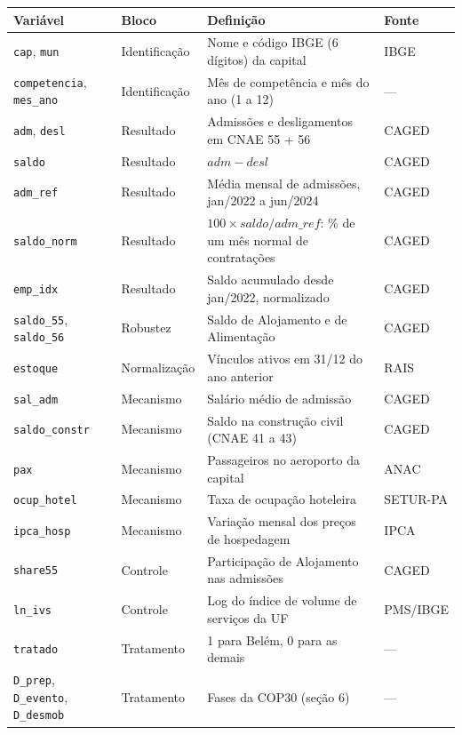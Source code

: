 \documentclass[11pt,a4paper]{article}
\newcommand{\var}[1]{\texttt{#1}}
\begin{document}
\begin{table}[H]
\centering\small
\begin{tabularx}{\linewidth}{p{3.3cm}p{2.1cm}Lp{2cm}}
\toprule
\textbf{Variável} & \textbf{Bloco} & \textbf{Definição} & \textbf{Fonte}\\
\midrule
\var{cap}, \var{mun} & Identificação & Nome e código IBGE (6 dígitos) da capital & IBGE\\
\var{competencia}, \var{mes\_ano} & Identificação & Mês de competência e mês do ano (1 a 12) & ---\\
\var{adm}, \var{desl} & Resultado & Admissões e desligamentos em CNAE 55 + 56 & CAGED\\
\var{saldo} & Resultado & $adm - desl$ & CAGED\\
\var{adm\_ref} & Resultado & Média mensal de admissões, jan/2022 a jun/2024 & CAGED\\
\var{saldo\_norm} & Resultado & $100 \times saldo / adm\_ref$: \% de um mês normal de contratações & CAGED\\
\var{emp\_idx} & Resultado & Saldo acumulado desde jan/2022, normalizado & CAGED\\
\var{saldo\_55}, \var{saldo\_56} & Robustez & Saldo de Alojamento e de Alimentação & CAGED\\
\var{estoque} & Normalização & Vínculos ativos em 31/12 do ano anterior & RAIS\\
\var{sal\_adm} & Mecanismo & Salário médio de admissão & CAGED\\
\var{saldo\_constr} & Mecanismo & Saldo na construção civil (CNAE 41 a 43) & CAGED\\
\var{pax} & Mecanismo & Passageiros no aeroporto da capital & ANAC\\
\var{ocup\_hotel} & Mecanismo & Taxa de ocupação hoteleira & SETUR-PA\\
\var{ipca\_hosp} & Mecanismo & Variação mensal dos preços de hospedagem & IPCA\\
\var{share55} & Controle & Participação de Alojamento nas admissões & CAGED\\
\var{ln\_ivs} & Controle & Log do índice de volume de serviços da UF & PMS/IBGE\\
\var{tratado} & Tratamento & 1 para Belém, 0 para as demais & ---\\
\var{D\_prep}, \var{D\_evento}, \var{D\_desmob} & Tratamento & Fases da COP30 (seção 6) & ---\\
\bottomrule
\end{tabularx}
\end{table}
\end{document}
